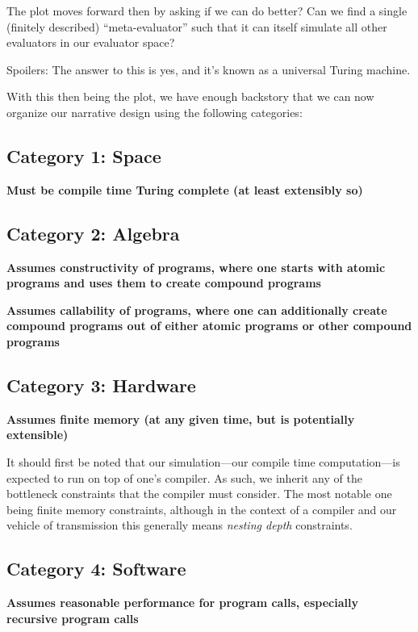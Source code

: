 \documentclass[twoside]{article}
\newcommand{\strong}[1]{{\bfseries #1}}
\begin{document}
The plot moves forward then by asking if we can do better? Can we find a single (finitely described)
``meta-evaluator'' such that it can itself simulate all other evaluators in our evaluator space?

Spoilers: The answer to this is yes, and it's known as a universal Turing machine.

With this then being the plot, we have enough backstory that we can now organize our narrative design
using the following categories:

\subsection*{Category 1: Space}

\strong{Must be compile time Turing complete (at least extensibly so)}

\subsection*{Category 2: Algebra}

\strong{Assumes constructivity of programs, where one starts with atomic
	programs and uses them to create compound programs}

\strong{Assumes callability of programs, where one can additionally create compound
	programs out of either atomic programs or other compound programs}

\subsection*{Category 3: Hardware}

\strong{Assumes finite memory (at any given time, but is potentially extensible)}

It should first be noted that our simulation---our compile time computation---is expected to run on top of one's compiler.
As such, we inherit any of the bottleneck constraints that the compiler must consider. The most notable one being
finite memory constraints, although in the context of a compiler and our vehicle of transmission this generally means
\emph{nesting depth} constraints.

\subsection*{Category 4: Software}

\strong{Assumes reasonable performance for program calls, especially recursive program calls}
\end{document}
